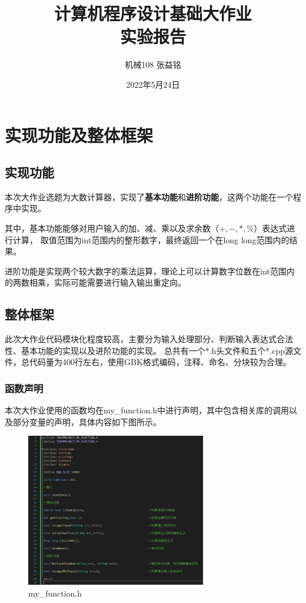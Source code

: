 \documentclass[a4paper, 11pt, UTF8]{ctexart}
\title{计算机程序设计基础大作业\\实验报告}
\author{机械108 \qquad 张益铭 \qquad 2021010552}
\date{2022年5月24日}
\begin{document}
\maketitle

\tableofcontents


\newpage

\section{实现功能及整体框架}

\subsection{实现功能}

本次大作业选题为大数计算器，实现了\textbf{基本功能}和\textbf{进阶功能}，这两个功能在一个程序中实现。

其中，基本功能能够对用户输入的加、减、乘以及求余数（$+, -, *, \% $）表达式进行计算，
取值范围为int范围内的整形数字，最终返回一个在long long范围内的结果。

进阶功能是实现两个较大数字的乘法运算，理论上可以计算数字位数在int范围内的两数相乘，实际可能需要进行输入输出重定向。

\subsection{整体框架}

此次大作业代码模块化程度较高，主要分为输入处理部分、判断输入表达式合法性、基本功能的实现以及进阶功能的实现。
总共有一个*.h头文件和五个*.cpp源文件，总代码量为400行左右，使用GBK格式编码，注释、命名、分块较为合理。

\subsubsection{函数声明}

本次大作业使用的函数均在my\_function.h中进行声明，其中包含相关库的调用以及部分变量的声明，具体内容如下图所示。

\begin{figure}[H]
    \centering
    \includegraphics[width=0.7\textwidth]{my_function}
    \caption{my\_function.h}
\end{figure}
\end{document}
